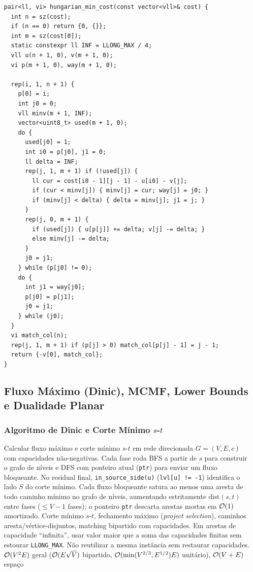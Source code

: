 \begin{lstlisting}
pair<ll, vi> hungarian_min_cost(const vector<vll>& cost) {
  int n = sz(cost);
  if (n == 0) return {0, {}};
  int m = sz(cost[0]);
  static constexpr ll INF = LLONG_MAX / 4;
  vll u(n + 1, 0), v(m + 1, 0);
  vi p(m + 1, 0), way(m + 1, 0);

  rep(i, 1, n + 1) {
    p[0] = i;
    int j0 = 0;
    vll minv(m + 1, INF);
    vector<uint8_t> used(m + 1, 0);
    do {
      used[j0] = 1;
      int i0 = p[j0], j1 = 0;
      ll delta = INF;
      rep(j, 1, m + 1) if (!used[j]) {
        ll cur = cost[i0 - 1][j - 1] - u[i0] - v[j];
        if (cur < minv[j]) { minv[j] = cur; way[j] = j0; }
        if (minv[j] < delta) { delta = minv[j]; j1 = j; }
      }
      rep(j, 0, m + 1) {
        if (used[j]) { u[p[j]] += delta; v[j] -= delta; }
        else minv[j] -= delta;
      }
      j0 = j1;
    } while (p[j0] != 0);
    do {
      int j1 = way[j0];
      p[j0] = p[j1];
      j0 = j1;
    } while (j0);
  }
  vi match_col(n);
  rep(j, 1, m + 1) if (p[j] > 0) match_col[p[j] - 1] = j - 1;
  return {-v[0], match_col};
}
\end{lstlisting}

\subsection{Fluxo Máximo (Dinic), MCMF, Lower Bounds e Dualidade Planar}

\subsubsection{Algoritmo de Dinic e Corte Mínimo $s$-$t$}
\algobox
  {Calcular fluxo máximo e corte mínimo $s$-$t$ em rede direcionada $G = (V, E, c)$ com capacidades não-negativas.}
  {Cada fase roda BFS a partir de $s$ para construir o grafo de níveis e DFS com ponteiro atual (\texttt{ptr}) para enviar um fluxo bloqueante. No residual final, \texttt{in\_source\_side(u)} (\texttt{lvl[u] != -1}) identifica o lado $S$ do corte mínimo.}
  {Cada fluxo bloqueante satura ao menos uma aresta de todo caminho mínimo no grafo de níveis, aumentando estritamente $\text{dist}(s, t)$ entre fases ($\le V - 1$ fases); o ponteiro \texttt{ptr} descarta arestas mortas em $\mathcal{O}(1)$ amortizado.}
  {Corte mínimo $s$-$t$, fechamento máximo (\emph{project selection}), caminhos aresta/vértice-disjuntos, matching bipartido com capacidades.}
  {Em arestas de capacidade ``infinita'', usar valor maior que a soma das capacidades finitas sem estourar \texttt{LLONG\_MAX}. Não reutilizar a mesma instância sem restaurar capacidades.}
  {$\mathcal{O}(V^2 E)$ geral ($\mathcal{O}(E\sqrt{V})$ bipartido, $\mathcal{O}(\min(V^{2/3}, E^{1/2})E)$ unitário), $\mathcal{O}(V + E)$ espaço}

